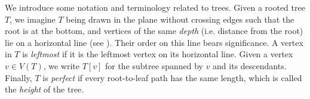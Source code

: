 \documentclass[11pt]{article}
\theoremstyle{definition}
\begin{document}
We introduce some notation and terminology related to trees. Given a rooted tree $T$, we imagine $T$ being drawn in the plane without crossing edges such that the root is at the bottom, and vertices of the same \emph{depth} (i.e. distance from the root) lie on a horizontal line (see ). Their order on this line bears significance. A vertex in $T$ is \emph{leftmost} if it is the leftmost vertex on its horizontal line.  Given a vertex $v\in V(T)$, we write $T[v]$ for the subtree spanned by $v$ and its descendants. Finally, $T$ is \emph{perfect} if every root-to-leaf path has the same length, which is called the \emph{height} of the tree.



\begin{figure}
\begin{center}
\begin{tikzpicture}[
    dot/.style={
        circle,
        draw=black,
        fill=black,
        minimum size=3mm,
        inner sep=0pt,
        outer sep=0pt
    },
    every label/.style={
        align=center,
        inner sep=5pt,
        font=\small
    },
    every edge from parent node/.style={
        align=center,
        font=\footnotesize,
        inner sep=10pt
    },
    level distance=2cm,
    level 1/.style={sibling distance=4cm},
    level 2/.style={sibling distance=2cm},
    grow=up
]


\end{tikzpicture}
\end{center}
\end{figure}
\end{document}
